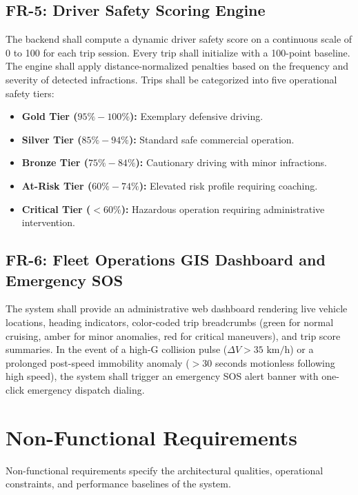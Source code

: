 \subsection{FR-5: Driver Safety Scoring Engine}
The backend shall compute a dynamic driver safety score on a continuous scale of 0 to 100 for each trip session. Every trip shall initialize with a 100-point baseline. The engine shall apply distance-normalized penalties based on the frequency and severity of detected infractions. Trips shall be categorized into five operational safety tiers:
\begin{itemize}
    \item \textbf{Gold Tier ($95\% - 100\%$):} Exemplary defensive driving.
    \item \textbf{Silver Tier ($85\% - 94\%$):} Standard safe commercial operation.
    \item \textbf{Bronze Tier ($75\% - 84\%$):} Cautionary driving with minor infractions.
    \item \textbf{At-Risk Tier ($60\% - 74\%$):} Elevated risk profile requiring coaching.
    \item \textbf{Critical Tier ($< 60\%$):} Hazardous operation requiring administrative intervention.
\end{itemize}

\subsection{FR-6: Fleet Operations GIS Dashboard and Emergency SOS}
The system shall provide an administrative web dashboard rendering live vehicle locations, heading indicators, color-coded trip breadcrumbs (green for normal cruising, amber for minor anomalies, red for critical maneuvers), and trip score summaries. In the event of a high-G collision pulse ($\Delta V > 35\text{ km/h}$) or a prolonged post-speed immobility anomaly ($>30$ seconds motionless following high speed), the system shall trigger an emergency SOS alert banner with one-click emergency dispatch dialing.

\section{Non-Functional Requirements}
\label{sec:non_functional_reqs}
Non-functional requirements specify the architectural qualities, operational constraints, and performance baselines of the system.

